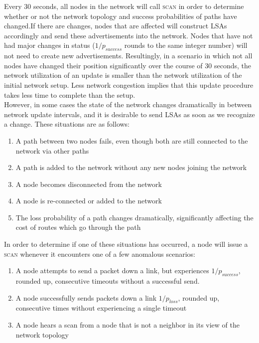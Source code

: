 \documentclass[letterpaper]{article}
\begin{document}
\noindent Every 30 seconds, all nodes in the network will call 
\textsc{scan} in order to determine whether or not the network topology and success probabilities of
paths have changed.If there are changes, nodes that are affected will construct LSAs accordingly and send
these advertisements into the network. Nodes that have not had major changes in status ($1/p_{success}$ rounds
to the same integer number) will not need to create new advertisements. Resultingly, in a scenario in which
not all nodes have changed their position significantly over the course of 30 seconds, the network utilization 
of an update is smaller than the network utilization of the initial network setup. Less network congestion 
implies that this update procedure takes less time to complete than the setup.
\\

\noindent However, in some cases the state of the network changes dramatically in 
between network update intervals, and it is desirable to send LSAs as soon as we recognize a change.
These situations are as follows:

\begin{enumerate}
  \item A path between two nodes fails, even though both are still connected to the network via other
  paths
  \item A path is added to the network without any new nodes joining the network
  \item A node becomes disconnected from the network
  \item A node is re-connected or added to the network
  \item The loss probability of a path changes dramatically, significantly affecting the cost of
  routes which go through the path
\end{enumerate}

\noindent In order to determine if one of these situations has occurred, a node will issue a 
\textsc{scan} whenever it encounters one of a few anomalous scenarios:

\begin{enumerate}
  \item A node attempts to send a packet down a link, but experiences $1/p_{success}$, rounded up, 
  consecutive timeouts without a successful send.
  \item A node successfully sends packets down a link $1/p_{loss}$, rounded up, consecutive times without
  experiencing a single timeout
  \item A node hears a scan from a node that is not a neighbor in its view of the network topology
\end{enumerate}
\end{document}
